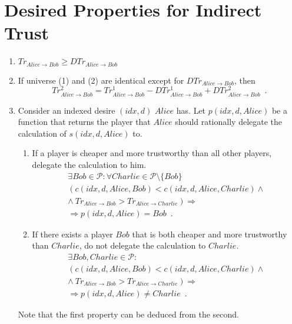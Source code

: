 \section{Desired Properties for Indirect Trust}
  \begin{enumerate}
    \item $Tr_{Alice \rightarrow Bob} \geq DTr_{Alice \rightarrow Bob}$
    \item If universe (1) and (2) are identical except for $DTr_{Alice \rightarrow Bob}$, then
      \begin{equation*}
	Tr^2_{Alice \rightarrow Bob} = Tr^1_{Alice \rightarrow Bob} - DTr^1_{Alice \rightarrow Bob} + DTr^2_{Alice \rightarrow
	Bob} \enspace.
      \end{equation*}
    \item Consider an indexed desire $\left(idx, d\right)$ $Alice$ has. Let $p\left(idx, d, Alice\right)$ be a function that
    returns the player that $Alice$ should rationally delegate the calculation of $s\left(idx, d, Alice\right)$ to.
      \begin{enumerate}
        \item If a player is cheaper and more trustworthy than all other players, delegate the calculation to him.
        \begin{gather*}
	  \exists Bob \in \mathcal{P}: \forall Charlie \in \mathcal{P} \setminus \{Bob\} \\
	  \left(c\left(idx, d, Alice, Bob\right) < c\left(idx, d, Alice, Charlie\right) \wedge \right. \\
	  \left. \wedge \ Tr_{Alice \rightarrow Bob} > Tr_{Alice \rightarrow Charlie}\right) \Rightarrow \\
	  \Rightarrow p\left(idx, d, Alice\right) = Bob \enspace.
	\end{gather*}
	\item If there exists a player $Bob$ that is both cheaper and more trustworthy than $Charlie$, do not delegate the
	calculation to $Charlie$.
	\begin{gather*}
	  \exists Bob, Charlie \in \mathcal{P}: \\
	  \left(c\left(idx, d, Alice, Bob\right) < c\left(idx, d, Alice, Charlie\right) \wedge \right. \\
	  \left. \wedge \ Tr_{Alice \rightarrow Bob} > Tr_{Alice \rightarrow Charlie}\right) \Rightarrow \\
	  \Rightarrow p\left(idx, d, Alice\right) \neq Charlie \enspace.
	\end{gather*}
      \end{enumerate}
      Note that the first property can be deduced from the second.
  \end{enumerate}

